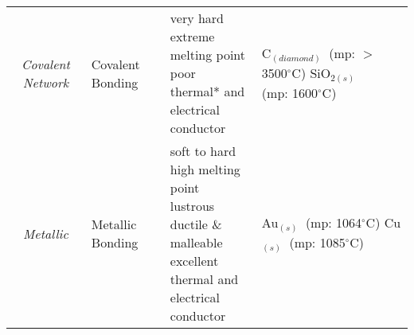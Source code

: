 \documentclass{article}
\begin{document}
\begin{qq}
\begin{center}
\begin{tabular}{clll}
					\textit{Covalent Network}& Covalent Bonding& \makecell[l]{very hard \\ extreme melting point\\ poor thermal* and \\ electrical conductor} &  \makecell[l]{ C$_{(diamond)}$ $\:$\textcolor{pag!60}{(mp: $>$3500$^{\circ}$C)} \\ SiO$_{2(s)}$ $\:\:\:\:\:\:\:$\textcolor{pag!60}{(mp:  1600$^{\circ}$C)} }	\TBstrutsolids \\
					
					\textit{Metallic}& Metallic Bonding& \makecell[l]{soft to hard \\ high melting point\\ lustrous \\ ductile \& malleable \\ excellent thermal and \\ electrical conductor} &  \makecell[l]{ Au$_{(s)}$ $\:$\textcolor{pag!60}{(mp: 1064$^{\circ}$C)} \\ Cu$_{(s)}$ $\:$\textcolor{pag!60}{(mp:  1085$^{\circ}$C)} }	\TBstrutsolids \\
						\end{tabular}
			\end{center}
			
			
		\end{qq}
		
		\pagebreak
		
\end{document}
